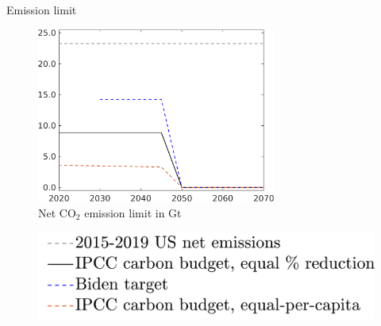 \documentclass[11pt,aspectratio=169]{beamer}
\begin{document}
\begin{frame}{Emission limit}
	\begin{center}
		\begin{minipage}{0.6\textwidth}
			\begin{figure}
				\caption{Net CO$_2$ emission limit in Gt}
				\includegraphics[width=0.7\textwidth]{../codding_model/own_basedOnFried/optimalPol_010922_revision/figures/all_13Sept22_Tplus30/Emnet_goals_o1_lgd0.png}
			\end{figure}
		\end{minipage}
		\hspace{-10mm}
		\begin{minipage}{0.3\textwidth}
			\begin{figure}
				\includegraphics[width=1.4\textwidth]{../codding_model/own_basedOnFried/optimalPol_010922_revision/figures/all_13Sept22_Tplus30/Emnet_goals_o1_lgd1.png}
			\end{figure}
		\end{minipage}
	\end{center}
\end{frame}
\end{document}
